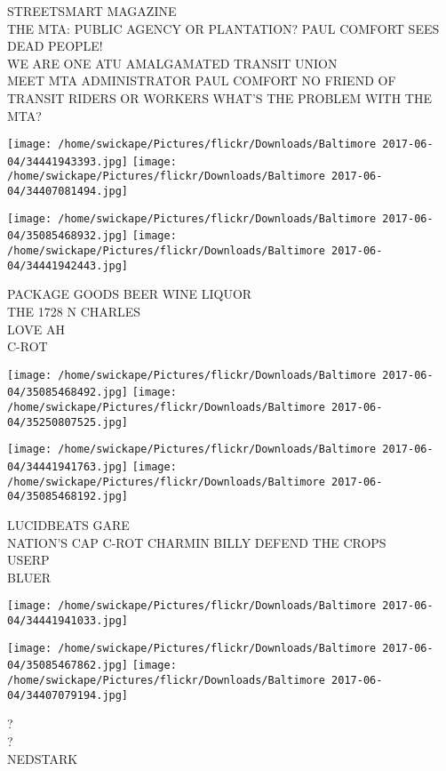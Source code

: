 \documentclass[10pt,letterpaper]{article}
\begin{document}
STREETSMART MAGAZINE\\
THE MTA: PUBLIC AGENCY OR PLANTATION?  PAUL COMFORT SEES DEAD PEOPLE!\\
WE ARE ONE ATU AMALGAMATED TRANSIT UNION\\
MEET MTA ADMINISTRATOR PAUL COMFORT NO FRIEND OF TRANSIT RIDERS OR WORKERS WHAT'S THE PROBLEM WITH THE MTA?
\pagebreak

\texttt{[image: /home/swickape/Pictures/flickr/Downloads/Baltimore 2017-06-04/34441943393.jpg]}
\texttt{[image: /home/swickape/Pictures/flickr/Downloads/Baltimore 2017-06-04/34407081494.jpg]}

\texttt{[image: /home/swickape/Pictures/flickr/Downloads/Baltimore 2017-06-04/35085468932.jpg]}
\texttt{[image: /home/swickape/Pictures/flickr/Downloads/Baltimore 2017-06-04/34441942443.jpg]}

PACKAGE GOODS BEER WINE LIQUOR\\
THE 1728 N CHARLES\\
LOVE AH\\
C{-}ROT
\pagebreak

\texttt{[image: /home/swickape/Pictures/flickr/Downloads/Baltimore 2017-06-04/35085468492.jpg]}
\texttt{[image: /home/swickape/Pictures/flickr/Downloads/Baltimore 2017-06-04/35250807525.jpg]}

\texttt{[image: /home/swickape/Pictures/flickr/Downloads/Baltimore 2017-06-04/34441941763.jpg]}
\texttt{[image: /home/swickape/Pictures/flickr/Downloads/Baltimore 2017-06-04/35085468192.jpg]}

LUCIDBEATS GARE\\
NATION'S CAP C{-}ROT CHARMIN BILLY DEFEND THE CROPS\\
USERP\\
BLUER
\pagebreak

\texttt{[image: /home/swickape/Pictures/flickr/Downloads/Baltimore 2017-06-04/34441941033.jpg]}

\vspace{0.25in}
\texttt{[image: /home/swickape/Pictures/flickr/Downloads/Baltimore 2017-06-04/35085467862.jpg]}
\texttt{[image: /home/swickape/Pictures/flickr/Downloads/Baltimore 2017-06-04/34407079194.jpg]}

?\\
?\\
NEDSTARK
\pagebreak
\end{document}
